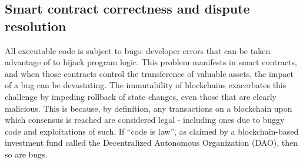 
\subsection{Smart contract correctness and dispute resolution}
All executable code is subject to bugs: developer errors that can be taken advantage of to hijack program logic. This problem manifests in smart contracts, and when those contracts control the transference of valuable assets, the impact of a bug can be devastating. The immutability of blockchains exacerbates this challenge by impeding rollback of state changes, even those that are clearly malicious. This is because, by definition, any transactions on a blockchain upon which consensus is reached are considered legal - including ones due to buggy code and exploitations of such. If ``code is law'', as claimed by a blockchain-based investment fund called the Decentralized Autonomous Organization (DAO), then so are bugs. 

